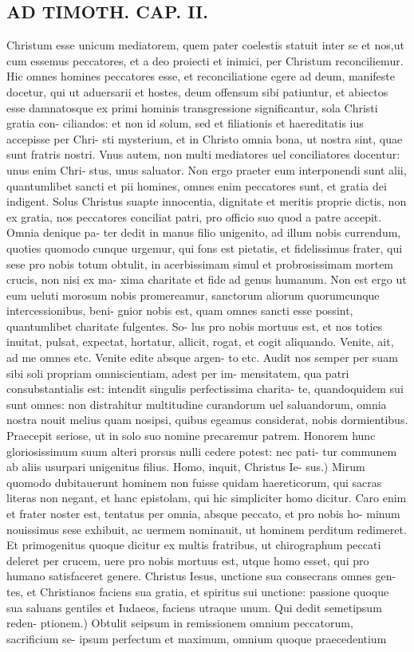 \documentclass{article}
\begin{document}
\begin{pages}
\section*{AD TIMOTH. CAP. II. }
\marginpar{[ p.483 ]}\pstart Christum esse unicum mediatorem, quem pater coelestis statuit inter se et nos,ut cum essemus peccatores, et a deo proiecti et inimici, per Christum reconciliemur. Hic omnes homines peccatores esse, et reconciliatione egere ad deum, manifeste docetur, qui ut aduersarii et hostes, deum offensum sibi patiuntur, et abiectos esse damnatosque ex primi hominis transgressione significantur, sola Christi gratia con- ciliandos: et non id solum, sed et filiationis et haereditatis ius accepisse per Chri- sti mysterium, et in Christo omnia bona, ut nostra sint, quae sunt fratris nostri. Vnus autem, non multi mediatores uel conciliatores docentur: unus enim Chri- stus, unus saluator. Non ergo praeter eum interponendi sunt alii, quantumlibet sancti et pii homines, omnes enim peccatores sunt, et gratia dei indigent. Solus Christus suapte innocentia, dignitate et meritis proprie dictis, non ex gratia, nos peccatores conciliat patri, pro officio suo quod a patre accepit. Omnia denique pa- ter dedit in manus filio unigenito, ad illum nobis currendum, quoties quomodo cunque urgemur, qui fons est pietatis, et fidelissimus frater, qui sese pro nobis totum obtulit, in acerbissimam simul et probrosissimam mortem crucis, non nisi ex ma- xima charitate et fide ad genus humanum. Non est ergo ut eum ueluti morosum nobis promereamur, sanctorum aliorum quorumcunque intercessionibus, beni- gnior nobis est, quam omnes sancti esse possint, quantumlibet charitate fulgentes. So- lus pro nobis mortuus est, et nos toties inuitat, pulsat, expectat, hortatur, allicit, rogat, et cogit aliquando. Venite, ait, ad me omnes etc. Venite edite absque argen- to etc. Audit nos semper per suam sibi soli propriam omniscientiam, adest per im- mensitatem, qua patri consubstantialis est: intendit singulis perfectissima charita- te, quandoquidem sui sunt omnes: non distrahitur multitudine curandorum uel saluandorum, omnia nostra nouit melius quam nosipsi, quibus egeamus considerat, nobis dormientibus. Praecepit seriose, ut in solo suo nomine precaremur patrem. Honorem hunc gloriosissimum suum alteri prorsus nulli cedere potest: nec pati- tur communem ab aliis usurpari unigenitus filius. Homo, inquit, Christus Ie- sus.) Mirum quomodo dubitauerunt hominem non fuisse quidam haereticorum, qui sacras literas non negant, et hanc epistolam, qui hic simpliciter homo dicitur. Caro enim et frater noster est, tentatus per omnia, absque peccato, et pro nobis ho- minum nouissimus sese exhibuit, ac uermem nominauit, ut hominem perditum redimeret. Et primogenitus quoque dicitur ex multis fratribus, ut chirographum peccati deleret per crucem, uere pro nobis mortuus est, utque homo esset, qui pro humano satisfaceret genere. Christus Iesus, unctione sua consecrans omnes gen- tes, et Christianos faciens sua gratia, et spiritus sui unctione: passione quoque sua saluans gentiles et Iudaeos, faciens utraque unum. Qui dedit semetipsum reden- ptionem.) Obtulit seipsum in remissionem omnium peccatorum, sacrificium se- ipsum perfectum et maximum, omnium quoque praecedentium 
\end{pages}
\end{document}
